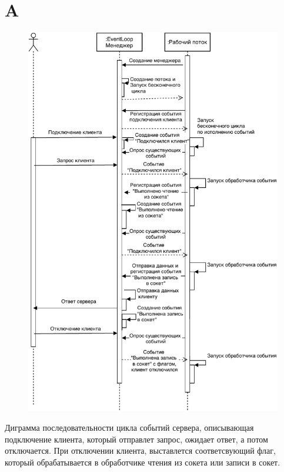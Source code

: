 \documentclass[a4paper,12pt]{report}
\begin{document}
	\section{A}\label{appendix:event_loop}
	 \begin{figure}[H]
    \centering
  \includegraphics[scale=01]{./resource/SequenceDiagram_EventLoop.pdf}
\end{figure}
  Диграмма последовательности цикла событий сервера, описывающая подключение клиента, который отправлет запрос, ожидает ответ, а потом отключается. При отключении клиента, выставлется соответсвующий флаг, который обрабатывается в обработчике чтения из сокета или записи в сокет.
\end{document}
